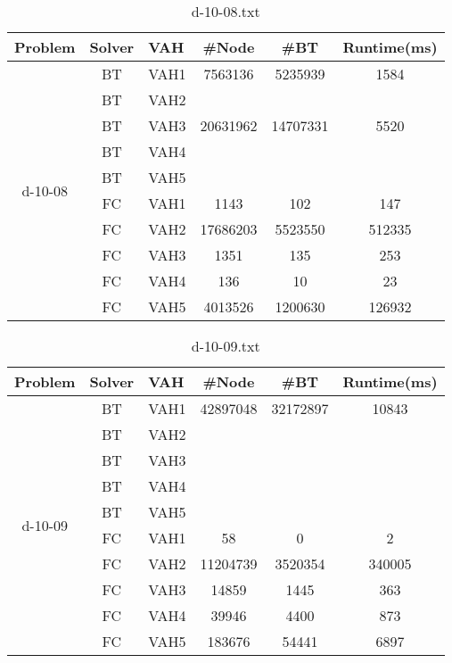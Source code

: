 \documentclass{article}
\begin{document}
\begin{table}[]
\caption{d-10-08.txt}
\label{tab:my-table}
\begin{tabular}{|c|c|c|c|c|c|}
\hline
Problem & Solver & \multicolumn{1}{l|}{VAH} & \#Node & \#BT & \multicolumn{1}{l|}{Runtime(ms)} \\ \hline
\multirow{10}{*}{d-10-08} & BT & VAH1 & 7563136 & 5235939 & 1584 \\ \cline{2-6} 
 & BT & VAH2 &  &  &  \\ \cline{2-6} 
 & BT & VAH3 & 20631962 & 14707331 & 5520 \\ \cline{2-6} 
 & BT & VAH4 &  &  &  \\ \cline{2-6} 
 & BT & VAH5 &  &  &  \\ \cline{2-6} 
 & FC & VAH1 & 1143 & 102 & 147 \\ \cline{2-6} 
 & FC & VAH2 & 17686203 & 5523550 & 512335 \\ \cline{2-6} 
 & FC & VAH3 & 1351 & 135 & 253 \\ \cline{2-6} 
 & FC & VAH4 & 136 & 10 & 23 \\ \cline{2-6} 
 & FC & VAH5 & 4013526 & 1200630 & 126932 \\ \hline
\end{tabular}
\end{table}

\begin{table}[]
\caption{d-10-09.txt}
\label{tab:my-table}
\begin{tabular}{|c|c|c|c|c|c|}
\hline
Problem & Solver & \multicolumn{1}{l|}{VAH} & \#Node & \#BT & \multicolumn{1}{l|}{Runtime(ms)} \\ \hline
\multirow{10}{*}{d-10-09} & BT & VAH1 & 42897048 & 32172897 & 10843 \\ \cline{2-6} 
 & BT & VAH2 &  &  &  \\ \cline{2-6} 
 & BT & VAH3 &  &  &  \\ \cline{2-6} 
 & BT & VAH4 &  &  &  \\ \cline{2-6} 
 & BT & VAH5 &  &  &  \\ \cline{2-6} 
 & FC & VAH1 & 58 & 0 & 2 \\ \cline{2-6} 
 & FC & VAH2 & 11204739 & 3520354 & 340005 \\ \cline{2-6} 
 & FC & VAH3 & 14859 & 1445 & 363 \\ \cline{2-6} 
 & FC & VAH4 & 39946 & 4400 & 873 \\ \cline{2-6} 
 & FC & VAH5 & 183676 & 54441 & 6897 \\ \hline
\end{tabular}
\end{table}
\end{document}
